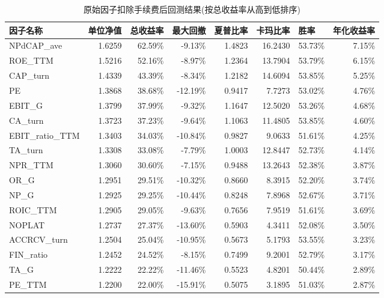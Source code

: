 \documentclass[11pt]{article}
\begin{document}
\begin{table}[htbp]
  \centering
  \caption{原始因子扣除手续费后回测结果(按总收益率从高到低排序)}
    \begin{tabular}{lrrrrrrr}
    \toprule
    因子名称  & \multicolumn{1}{l}{单位净值} & \multicolumn{1}{l}{总收益率} & \multicolumn{1}{l}{最大回撤} & \multicolumn{1}{l}{夏普比率} & \multicolumn{1}{l}{卡玛比率} & \multicolumn{1}{l}{胜率} & \multicolumn{1}{l}{年化收益率} \\
    \midrule
    NPdCAP\_ave & 1.6259  & 62.59\% & -9.13\% & 1.4823  & 16.2430  & 53.73\% & 7.15\% \\
    ROE\_TTM & 1.5216  & 52.16\% & -8.97\% & 1.2364  & 13.7904  & 53.79\% & 6.15\% \\
    CAP\_turn & 1.4339  & 43.39\% & -8.34\% & 1.2182  & 14.6094  & 53.85\% & 5.25\% \\
    PE    & 1.3868  & 38.68\% & -12.19\% & 0.9417  & 7.7273  & 53.02\% & 4.76\% \\
    EBIT\_G & 1.3799  & 37.99\% & -9.32\% & 1.1647  & 12.5020  & 53.26\% & 4.68\% \\
    CA\_turn & 1.3723  & 37.23\% & -9.64\% & 1.1063  & 11.4805  & 53.85\% & 4.60\% \\
    EBIT\_ratio\_TTM & 1.3403  & 34.03\% & -10.84\% & 0.9827  & 9.0633  & 51.61\% & 4.25\% \\
    TA\_turn & 1.3308  & 33.08\% & -7.79\% & 1.0003  & 12.8447  & 52.73\% & 4.14\% \\
    NPR\_TTM & 1.3060  & 30.60\% & -7.15\% & 0.9488  & 13.2643  & 52.38\% & 3.87\% \\
    OR\_G & 1.2951  & 29.51\% & -10.32\% & 0.8660  & 8.3915  & 52.20\% & 3.74\% \\
    NP\_G & 1.2925  & 29.25\% & -10.44\% & 0.8248  & 7.8968  & 52.67\% & 3.71\% \\
    ROIC\_TTM & 1.2905  & 29.05\% & -9.63\% & 0.7656  & 7.9519  & 51.61\% & 3.69\% \\
    NOPLAT & 1.2737  & 27.37\% & -13.60\% & 0.5903  & 4.3411  & 52.08\% & 3.50\% \\
    ACCRCV\_turn & 1.2504  & 25.04\% & -10.95\% & 0.5673  & 5.1793  & 53.55\% & 3.23\% \\
    FIN\_ratio & 1.2452  & 24.52\% & -8.15\% & 0.7499  & 9.2001  & 52.79\% & 3.17\% \\
    TA\_G & 1.2222  & 22.22\% & -11.46\% & 0.5523  & 4.8201  & 50.44\% & 2.89\% \\
    PE\_TTM & 1.2200  & 22.00\% & -15.91\% & 0.5075  & 3.1895  & 51.03\% & 2.87\% \\

\end{tabular}
\end{table}
\end{document}
